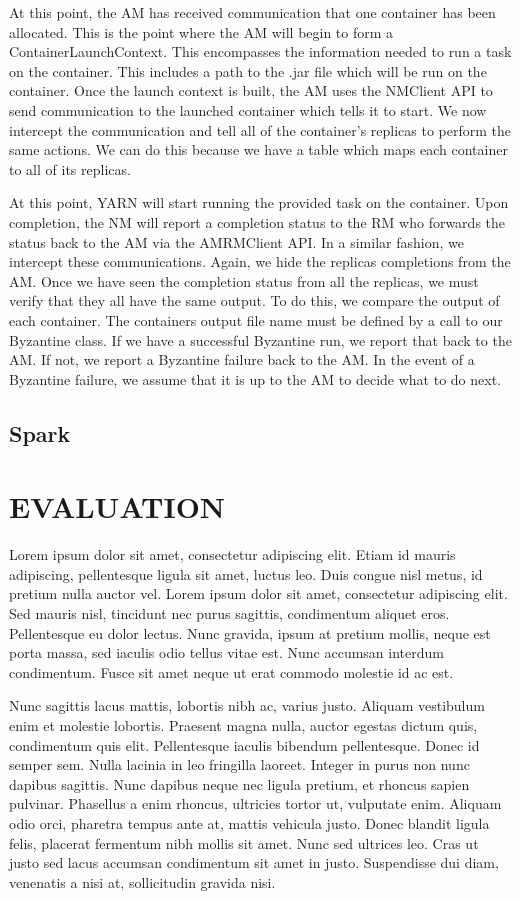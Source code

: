 \documentclass{sig-alternate}
\begin{document}
At this point, the AM has received communication that one container has been allocated. This is the point where the AM will begin to form a ContainerLaunchContext. This encompasses the
information needed to run a task on the container. This includes a path to the .jar file which will be run on the container. Once the launch context is built, the AM uses the NMClient
API to send communication to the launched container which tells it to start. We now intercept the communication and tell all of the container's replicas to perform the same
actions. We can do this because we have a table which maps each container to all of its replicas.

At this point, YARN will start running the provided task on the container. Upon completion, the NM will report a completion status to the RM who forwards the status back to the AM via 
the AMRMClient API. In a similar fashion, we intercept these communications. Again, we hide the replicas completions from the AM. Once we have seen the completion status from all the 
replicas, we must verify that they all have the same output. To do this, we compare the output of each container. The containers output file name must be defined by a call 
to our Byzantine class. If we have a successful Byzantine run, we report that back to the AM. If not, we report a Byzantine failure back to the AM. In the event of 
a Byzantine failure, we assume that it is up to the AM to decide what to do next.



\subsection{Spark}
 

\section {EVALUATION}
\label{sec:evaluation}
Lorem ipsum dolor sit amet, consectetur adipiscing elit. Etiam id mauris adipiscing, pellentesque ligula sit amet, luctus leo. 
Duis congue nisl metus, id pretium nulla auctor vel. Lorem ipsum dolor sit amet, consectetur adipiscing elit. Sed mauris nisl, 
tincidunt nec purus sagittis, condimentum aliquet eros. Pellentesque eu dolor lectus. Nunc gravida, ipsum at pretium mollis, neque 
est porta massa, sed iaculis odio tellus vitae est. Nunc accumsan interdum condimentum. Fusce sit amet neque ut erat commodo molestie id ac est.

Nunc sagittis lacus mattis, lobortis nibh ac, varius justo. Aliquam vestibulum enim et molestie lobortis. Praesent magna nulla, auctor
egestas dictum quis, condimentum quis elit. Pellentesque iaculis bibendum pellentesque. Donec id semper sem. Nulla lacinia in leo fringilla 
laoreet. Integer in purus non nunc dapibus sagittis. Nunc dapibus neque nec ligula pretium, et rhoncus sapien pulvinar. Phasellus a enim rhoncus,
 ultricies tortor ut, vulputate enim. Aliquam odio orci, pharetra tempus ante at, mattis vehicula justo. Donec blandit ligula felis, placerat 
 fermentum nibh mollis sit amet. Nunc sed ultrices leo. Cras ut justo sed lacus accumsan condimentum sit amet in justo. Suspendisse dui diam, 
 venenatis a nisi at, sollicitudin gravida nisi.
 
\end{document}
